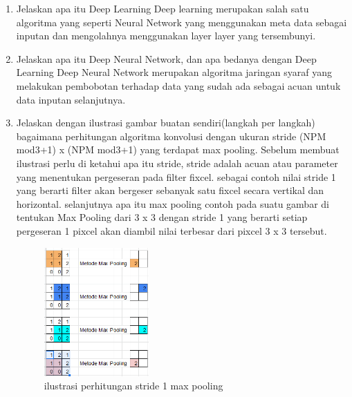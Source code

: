 \begin{enumerate}
    \item Jelaskan apa itu Deep Learning
    \hfill\break
    Deep learning merupakan salah satu algoritma yang seperti Neural Network yang menggunakan meta data sebagai inputan dan mengolahnya menggunakan layer layer yang tersembunyi.

    \item Jelaskan apa itu Deep Neural Network, dan apa bedanya dengan Deep Learning
    \hfill\break
    Deep Neural Network merupakan algoritma jaringan syaraf yang melakukan pembobotan terhadap data yang sudah ada sebagai acuan untuk data inputan selanjutnya. 

    \item Jelaskan dengan ilustrasi gambar buatan sendiri(langkah per langkah) bagaimana perhitungan algoritma konvolusi dengan ukuran stride (NPM mod3+1) x (NPM mod3+1) yang terdapat max pooling.
    \hfill\break
    Sebelum membuat ilustrasi perlu di ketahui apa itu stride, stride adalah acuan atau parameter yang menentukan pergeseran pada ﬁlter ﬁxcel. sebagai contoh nilai stride 1 yang berarti ﬁlter akan bergeser sebanyak satu ﬁxcel secara vertikal dan horizontal. selanjutnya apa itu max pooling contoh pada suatu gambar di tentukan Max Pooling dari 3 x 3 dengan stride 1 yang berarti setiap pergeseran 1 pixcel akan diambil nilai terbesar dari pixcel 3 x 3 tersebut.
    \begin{figure}[H]
	    \centering
	    \includegraphics[width=4cm]{figures/1174096/tugas7/teori_10.PNG}
	    \caption{ilustrasi perhitungan stride 1 max pooling}
    \end{figure}
\end{enumerate}

